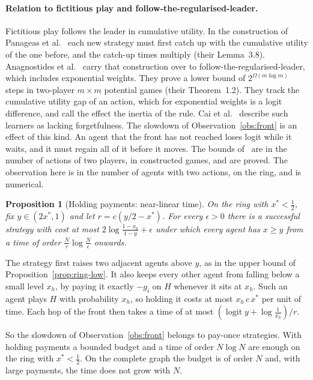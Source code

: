 \documentclass[11pt,a4paper]{article}
\theoremstyle{definition}
\theoremstyle{plain}
\newtheorem{proposition}{Proposition}
\newcommand{\xs}{x^{*}}
\begin{document}
\paragraph{Relation to fictitious play and follow-the-regularised-leader.}
Fictitious play follows the leader in cumulative utility. In the construction of Panageas et al.~\cite{panageas2023} each new strategy must first catch up with the cumulative utility of the one before, and the catch-up times multiply (their Lemma~3.8). Anagnostides et al.~\cite{anagnostides2026} carry that construction over to follow-the-regularised-leader, which includes exponential weights. They prove a lower bound of $2^{\Omega(m\log m)}$ steps in two-player $m\times m$ potential games (their Theorem~1.2). They track the cumulative utility gap of an action, which for exponential weights is a logit difference, and call the effect the inertia of the rule. Cai et al.~\cite{cai2024} describe such learners as lacking forgetfulness. The slowdown of Observation~\ref{obs:front} is an effect of this kind. An agent that the front has not reached loses logit while it waits, and it must regain all of it before it moves. The bounds of~\cite{panageas2023,anagnostides2026} are in the number of actions of two players, in constructed games, and are proved. The observation here is in the number of agents with two actions, on the ring, and is numerical.

\begin{proposition}[Holding payments: near-linear time]\label{prop:hold}
On the ring with $\xs<\tfrac12$, fix $y\in(2\xs,1)$ and let $r=c(y/2-\xs)$. For every $\epsilon>0$ there is a successful strategy with cost at most $2\log\frac{1-x_0}{1-y}+\epsilon$ under which every agent has $x\ge y$ from a time of order $\frac{N}{r}\log\frac{N}{\epsilon}$ onwards.
\end{proposition}

The strategy first raises two adjacent agents above $y$, as in the upper bound of Proposition~\ref{prop:ring-low}. It also keeps every other agent from falling below a small level $x_h$, by paying it exactly $-g_i$ on $H$ whenever it sits at $x_h$. Such an agent plays $H$ with probability $x_h$, so holding it costs at most $x_h\,c\,\xs$ per unit of time. Each hop of the front then takes a time of at most $(\operatorname{logit}y+\log\frac1{x_h})/r$.

So the slowdown of Observation~\ref{obs:front} belongs to pay-once strategies. With holding payments a bounded budget and a time of order $N\log N$ are enough on the ring with $\xs<\tfrac12$. On the complete graph the budget is of order $N$ and, with large payments, the time does not grow with $N$.
\end{document}
